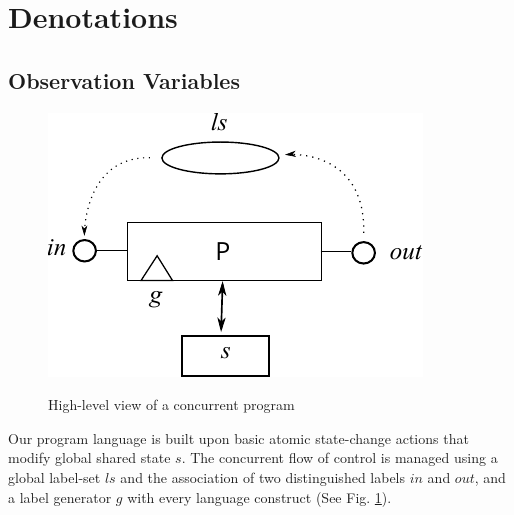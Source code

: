 \section{Denotations}\label{sec:denote}

\subsection{Observation Variables}

\begin{figure}
  \centering
  \includegraphics{images/parallel-program}\\
  \caption{High-level view of a concurrent program}
  \label{fig:high-level-prog}
\end{figure}
Our program language is built upon basic atomic state-change
actions that modify global shared state $s$.
The concurrent flow of control is managed using a global label-set $ls$
and the association of two distinguished labels $in$ and $out$,
and a label generator $g$ with every language construct
(See Fig. \ref{fig:high-level-prog}).

